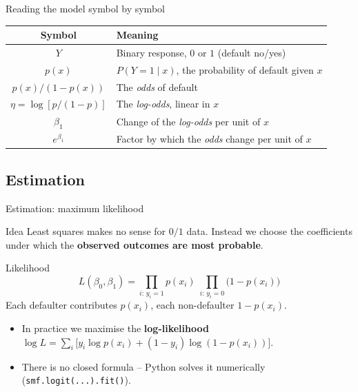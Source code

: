 \documentclass[aspectratio=169,11pt]{beamer}
\begin{document}
\begin{frame}{Reading the model symbol by symbol}
  \begin{center}
    \renewcommand{\arraystretch}{1.3}
    \begin{tabular}{@{}cl@{}}
      \toprule
      \textbf{Symbol} & \textbf{Meaning} \\
      \midrule
      $Y$ & Binary response, $0$ or $1$ (default no/yes) \\
      $p(x)$ & $P(Y=1\mid x)$, the probability of default given $x$ \\
      $p(x)/(1-p(x))$ & The \emph{odds} of default \\
      $\eta=\log[p/(1-p)]$ & The \emph{log-odds}, linear in $x$ \\
      $\beta_1$ & Change of the \emph{log-odds} per unit of $x$ \\
      $e^{\beta_1}$ & Factor by which the \emph{odds} change per unit of $x$ \\
      \bottomrule
    \end{tabular}
  \end{center}
\end{frame}

\subsection{Estimation}

\begin{frame}{Estimation: maximum likelihood}
  \begin{block}{Idea}
    Least squares makes no sense for $0/1$ data. Instead we choose the
    coefficients under which the \textbf{observed outcomes are most
    probable}.
  \end{block}
  \begin{block}{Likelihood}
    \[
      L(\beta_0,\beta_1)=\prod_{i:\,y_i=1}p(x_i)\;\prod_{i:\,y_i=0}\bigl(1-p(x_i)\bigr)
    \]
    Each defaulter contributes $p(x_i)$, each non-defaulter $1-p(x_i)$.
  \end{block}
  \begin{itemize}\setlength{\itemsep}{2pt}
    \item In practice we maximise the \textbf{log-likelihood}
          $\log L=\sum_i\bigl[y_i\log p(x_i)+(1-y_i)\log(1-p(x_i))\bigr]$.
    \item There is no closed formula -- Python solves it numerically
          (\texttt{smf.logit(...).fit()}).
  \end{itemize}
\end{frame}
\end{document}
